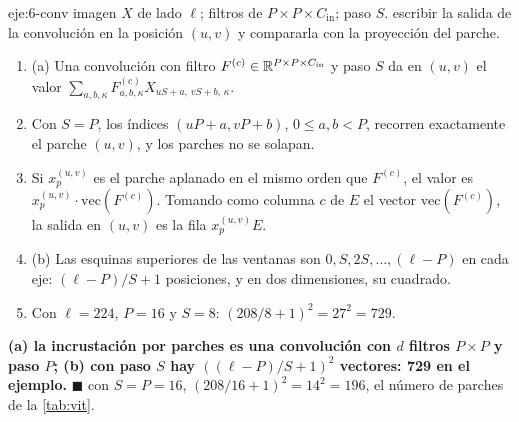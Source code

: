 \begin{solucion}{eje:6-conv}
\datos imagen $X$ de lado $\ell$; filtros de $P\times P\times C_{\mathrm{in}}$; paso $S$.
\planteamiento escribir la salida de la convolución en la posición $(u,v)$ y compararla con la proyección del parche.
\pasos
\begin{enumerate}[label=\arabic*.]
  \item (a) Una convolución con filtro $F^{(c)}\in\mathbb{R}^{P\times P\times C_{\mathrm{in}}}$ y paso $S$ da en $(u,v)$ el valor $\sum_{a,b,\kappa}F^{(c)}_{a,b,\kappa}X_{uS+a,\,vS+b,\,\kappa}$.
  \item Con $S=P$, los índices $(uP+a,vP+b)$, $0\le a,b<P$, recorren exactamente el parche $(u,v)$, y los parches no se solapan.
  \item Si $x_p^{(u,v)}$ es el parche aplanado en el mismo orden que $F^{(c)}$, el valor es $x_p^{(u,v)}\cdot\mathrm{vec}(F^{(c)})$. Tomando como columna $c$ de $E$ el vector $\mathrm{vec}(F^{(c)})$, la salida en $(u,v)$ es la fila $x_p^{(u,v)}E$.
  \item (b) Las esquinas superiores de las ventanas son $0,S,2S,\dots,(\ell-P)$ en cada eje: $(\ell-P)/S+1$ posiciones, y en dos dimensiones, su cuadrado.
  \item Con $\ell=224$, $P=16$ y $S=8$: $(208/8+1)^{2}=27^{2}=729$.
\end{enumerate}
\resultado \textbf{(a) la incrustación por parches es una convolución con $d$ filtros $P\times P$ y paso $P$; (b) con paso $S$ hay $((\ell-P)/S+1)^{2}$ vectores: 729 en el ejemplo.} $\blacksquare$
\comprobacion con $S=P=16$, $(208/16+1)^{2}=14^{2}=196$, el número de parches de la \cref{tab:vit}.
\end{solucion}
